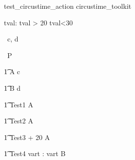 \begin{zsection}
   \SECTION test\_circustime\_action \parents circustime\_toolkit
\end{zsection}


\begin{axdef}
   tval: \nat
\where
   tval > 20 \land tval<30
\end{axdef}


\begin{circus}
   \circchannel\ c, d \\
\end{circus}

\begin{circus}
    \circprocess\ P \circdef \circbegin \\
\end{circus}

\begin{circusaction}
    	\t1 A \circdef c \then \Skip \\
\end{circusaction}

\begin{circusaction}
        \t1 B \circdef d \then \Skip \\
\end{circusaction}

\begin{circusaction}
   \t1 Test1 \circdef  {} \rcirctime \circstartby A  \\
\end{circusaction}

\begin{circusaction}
   \t1 Test2 \circdef  {}  \rcirctime \circstartby A  \\
\end{circusaction}

\begin{circusaction}
   \t1 Test3 \circdef  {} + 20 \rcirctime \circstartby A  \\
\end{circusaction}

\begin{circusaction}
   \t1 Test4 \circdef \circvres vart : \nat  \circspot  \lcirctime vart \rcirctime \circstartby B \\
\end{circusaction}


